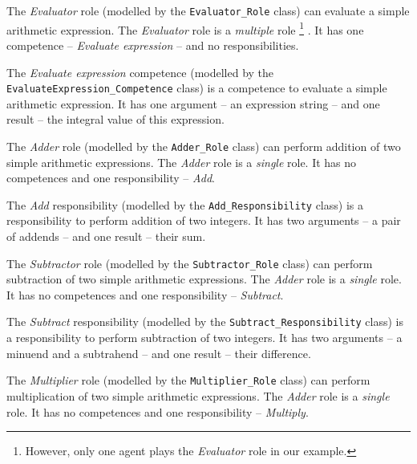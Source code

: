 The \textit{Evaluator} role (modelled by the \texttt{Evaluator\_Role} class) can evaluate a simple arithmetic expression.
The \textit{Evaluator} role is a \textit{multiple} role
\footnote{However, only one agent plays the \textit{Evaluator} role in our example.}
.
It has one competence -- \textit{Evaluate expression} -- and no responsibilities.

The \textit{Evaluate expression} competence (modelled by the \texttt{EvaluateExpression\_Competence} class) is a competence to evaluate a simple arithmetic expression.
It has one argument -- an expression string -- and one result -- the integral value of this expression. 

The \textit{Adder} role (modelled by the \texttt{Adder\_Role} class) can perform addition of two simple arithmetic expressions.
The \textit{Adder} role is a \textit{single} role.
It has no competences and one responsibility -- \textit{Add}.

The \textit{Add} responsibility (modelled by the \texttt{Add\_Responsibility} class) is a responsibility to perform addition of two integers.
It has two arguments -- a pair of addends -- and one result -- their sum.

The \textit{Subtractor} role (modelled by the \texttt{Subtractor\_Role} class) can perform subtraction of two simple arithmetic expressions.
The \textit{Adder} role is a \textit{single} role.
It has no competences and one responsibility -- \textit{Subtract}.

The \textit{Subtract} responsibility (modelled by the \texttt{Subtract\_Responsibility} class) is a responsibility to perform subtraction of two integers.
It has two arguments -- a minuend and a subtrahend -- and one result -- their difference.

The \textit{Multiplier} role (modelled by the \texttt{Multiplier\_Role} class) can perform multiplication of two simple arithmetic expressions.
The \textit{Adder} role is a \textit{single} role.
It has no competences and one responsibility -- \textit{Multiply}.

